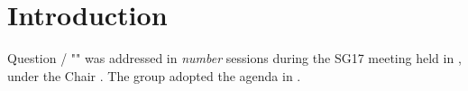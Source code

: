 
\section{Introduction}\label{introduction}



Question {\questions}/{\studyGroup} "{\questionTitle}" was addressed in \textit{number} sessions during the SG17 meeting held in {\place}, {\occurence} under the Chair {\leadership}\assistedBy. The group adopted the agenda in {\agendaRef}.

